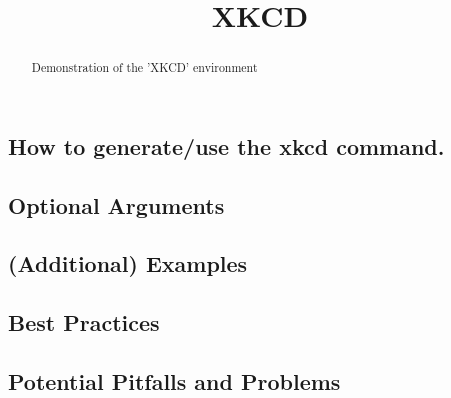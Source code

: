 \documentclass{ximera}
\title{XKCD}
\begin{document}
\begin{abstract}
    Demonstration of the 'XKCD' environment
\end{abstract}
\maketitle


    \subsection*{How to generate/use the xkcd command.}
        
        
        
    \subsection*{Optional Arguments}
    
        
        
    \subsection*{(Additional) Examples}
        
        
        
    \subsection*{Best Practices}
    
        
        
    \subsection*{Potential Pitfalls and Problems}   
        
        
        
        
\end{document}
